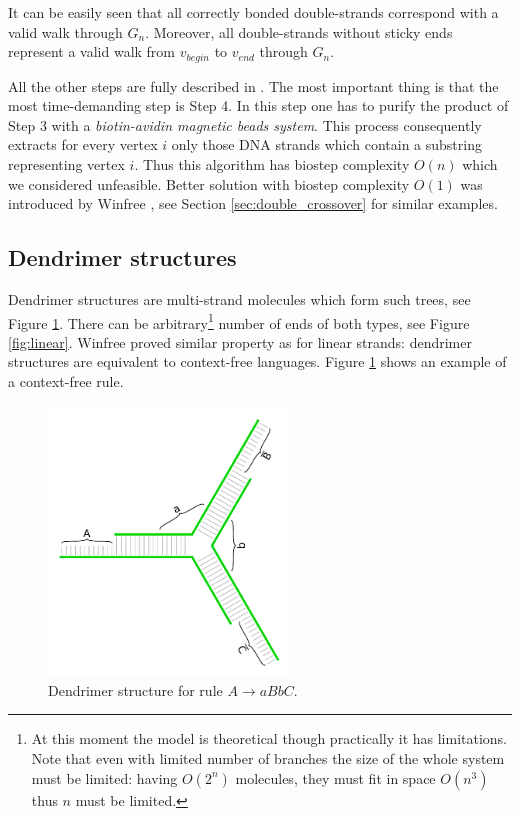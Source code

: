 		It can be easily seen that all correctly bonded double-strands correspond with a valid walk through $G_n$. Moreover, all double-strands without sticky ends represent a valid walk from $v_{begin}$ to $v_{end}$ through $G_n$.
		
		All the other steps are fully described in \cite{adleman94}. The most important thing is that the most time-demanding step is Step 4. In this step one has to purify the product of Step 3 with a {\em biotin-avidin magnetic beads system}. This process consequently extracts for every vertex $i$ only those DNA strands which contain a substring representing vertex $i$. Thus this algorithm has biostep complexity $O(n)$ which we considered unfeasible. Better solution with biostep complexity $O(1)$ was introduced by Winfree \cite{winfree_phd}, see Section \ref{sec:double_crossover} for similar examples.
	
	\subsection{Dendrimer structures}
	\label{sec:dendrimer}
		
		Dendrimer structures are multi-strand molecules which form such trees, see Figure \ref{fig:dendrimer}. There can be arbitrary\footnote{At this moment the model is theoretical though practically it has limitations. Note that even with limited number of branches the size of the whole system must be limited: having $O(2^n)$ molecules, they must fit in space $O(n^3)$ thus $n$ must be limited.} number of ends of both types, see Figure \ref{fig:linear}. Winfree \cite{winfree_phd} proved similar property as for linear strands: dendrimer structures are equivalent to context-free languages. Figure \ref{fig:dendrimer} shows an example of a context-free rule.
		
		\begin{figure}[h]
		\begin{center}
			\includegraphics[width=0.568\textwidth]{./figures/strand_types/dendrimer.pdf}
			\caption{Dendrimer structure for rule $A\rightarrow aBbC$.}
			\label{fig:dendrimer}
		\end{center}
		\end{figure}
	

